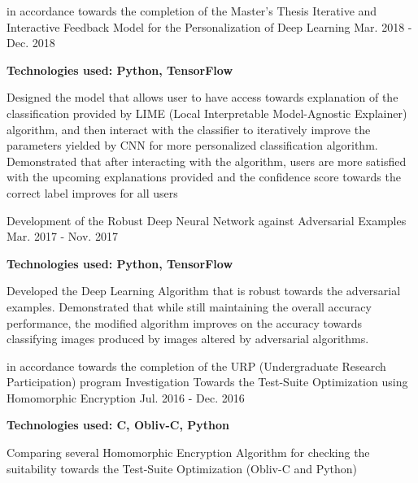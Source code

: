 \begin{cventries}
	
	\cventry
	{in accordance towards the completion of the Master's Thesis}
	{Iterative and Interactive Feedback Model for the Personalization of Deep Learning}
	{Mar. 2018 - Dec. 2018}
	{}
	{
		\begin{cvitemsForEducation}
			\item[] {}
			\item[] {\textbf{Technologies used: Python, TensorFlow}}
			\item {Designed the model that allows user to have access towards explanation of the classification provided by LIME (Local Interpretable Model-Agnostic Explainer) algorithm, and then interact with the classifier to iteratively improve the parameters yielded by CNN for more personalized classification algorithm. Demonstrated that after interacting with the algorithm, users are more satisfied with the upcoming explanations provided and the confidence score towards the correct label improves for all users}
		\end{cvitemsForEducation}
	}
	
	\cventry
	{}
	{Development of the Robust Deep Neural Network against Adversarial Examples}
	{Mar. 2017 - Nov. 2017}
	{}
	{
		\begin{cvitemsForEducation}
			\item[] {\textbf{Technologies used: Python, TensorFlow}}
			\item {Developed the Deep Learning Algorithm that is robust towards the adversarial examples. Demonstrated that while still maintaining the overall accuracy performance, the modified algorithm improves on the accuracy towards classifying images produced by images altered by adversarial algorithms.}
		\end{cvitemsForEducation}
	}

	\cventry
	{in accordance towards the completion of the URP (Undergraduate Research Participation) program}
	{Investigation Towards the Test-Suite Optimization using Homomorphic Encryption}
	{Jul. 2016 - Dec. 2016}
	{}
	{
		\begin{cvitemsForEducation}
			\item[] {}
			\item[] {\textbf{Technologies used: C, Obliv-C, Python}}
			\item {Comparing several Homomorphic Encryption Algorithm for checking the suitability towards the Test-Suite Optimization (Obliv-C and Python)}
		\end{cvitemsForEducation}
	}
\end{cventries}